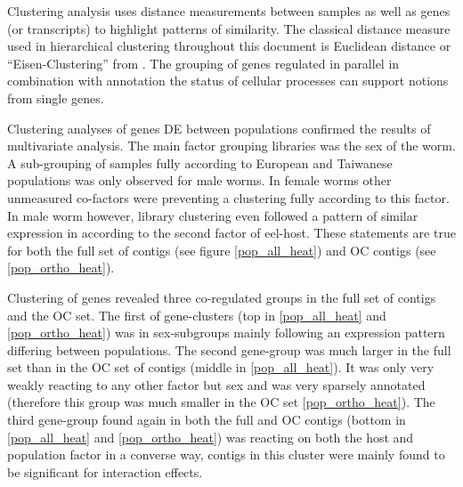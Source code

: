 Clustering analysis uses distance measurements between samples as well
as genes (or transcripts) to highlight patterns of similarity. The
classical distance measure used in hierarchical clustering throughout
this document is Euclidean distance or ``Eisen-Clustering'' from
\cite{pmid9843981}. The grouping of genes regulated in parallel in
combination with annotation the status of cellular processes can
support notions from single genes.

Clustering analyses of genes DE between populations confirmed the
results of multivariate analysis. The main factor grouping libraries
was the sex of the worm. A sub-grouping of samples fully according to
European and Taiwanese populations was only observed for male
worms. In female worms other unmeasured co-factors were preventing a
clustering fully according to this factor. In male worm however,
library clustering even followed a pattern of similar expression in
according to the second factor of eel-host. These statements are true
for both the full set of contigs (see figure \ref{pop_all_heat}) and
OC contigs (see \ref{pop_ortho_heat}).

Clustering of genes revealed three co-regulated groups in the full set
of contigs and the OC set. The first of gene-clusters (top in
\ref{pop_all_heat} and \ref{pop_ortho_heat}) was in sex-subgroups
mainly following an expression pattern differing between
populations. The second gene-group was much larger in the full set
than in the OC set of contigs (middle in \ref{pop_all_heat}). It was
only very weakly reacting to any other factor but sex and was very
sparsely annotated (therefore this group was much smaller in the OC set
\ref{pop_ortho_heat}). The third gene-group found again in both the
full and OC contigs (bottom in \ref{pop_all_heat} and
\ref{pop_ortho_heat}) was reacting on both the host and population
factor in a converse way, contigs in this cluster were mainly found to
be significant for interaction effects.


